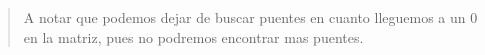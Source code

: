 \begin{quote}
\begin{center}
\begin{figure}[H]
            \label{fig:ciudades1}
        \end{figure}
    \end{center}

    A notar que podemos dejar de buscar puentes en cuanto lleguemos a un 0 en la matriz, pues no podremos encontrar mas puentes. \vspace{.2cm}
\end{quote}